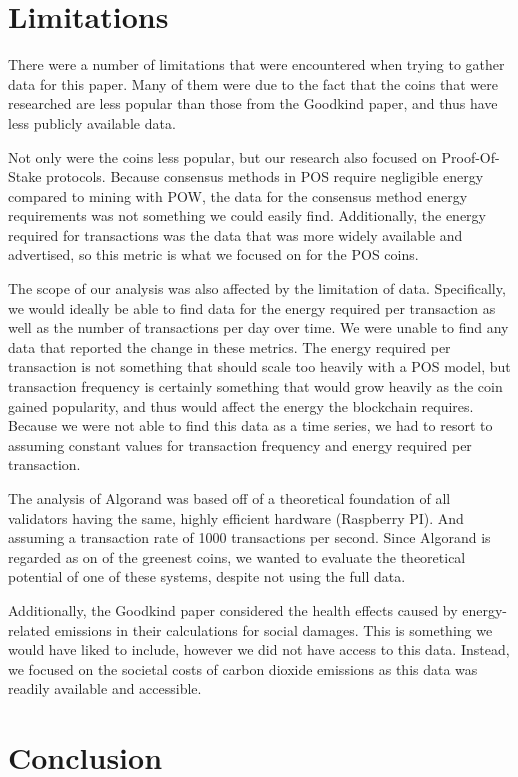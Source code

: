 \documentclass{article}
\begin{document}
\section{Limitations}

There were a number of limitations that were encountered when trying to gather data for this paper. Many of them were due to the fact that the coins that were researched are less popular than those from the Goodkind paper, and thus have less publicly available data.

Not only were the coins less popular, but our research also focused on Proof-Of-Stake protocols. Because consensus methods in POS require negligible energy compared to mining with POW, the data for the consensus method energy requirements was not something we could easily find. Additionally, the energy required for transactions was the data that was more widely available and advertised, so this metric is what we focused on for the POS coins.

The scope of our analysis was also affected by the limitation of data. Specifically, we would ideally be able to find data for the energy required per transaction as well as the number of transactions per day over time. We were unable to find any data that reported the change in these metrics. The energy required per transaction is not something that should scale too heavily with a POS model, but transaction frequency is certainly something that would grow heavily as the coin gained popularity, and thus would affect the energy the blockchain requires. Because we were not able to find this data as a time series, we had to resort to assuming constant values for transaction frequency and energy required per transaction.

The analysis of Algorand was based off of a theoretical foundation of all validators having the same, highly efficient hardware (Raspberry PI). And assuming a transaction rate of 1000 transactions per second. Since Algorand is regarded as on of the greenest coins, we wanted to evaluate the theoretical potential of one of these systems, despite not using the full data.

Additionally, the Goodkind paper considered the health effects caused by energy-related emissions in their calculations for social damages. This is something we would have liked to include, however we did not have access to this data. Instead, we focused on the societal costs of carbon dioxide emissions as this data was readily available and accessible.

\section{Conclusion}
\end{document}
